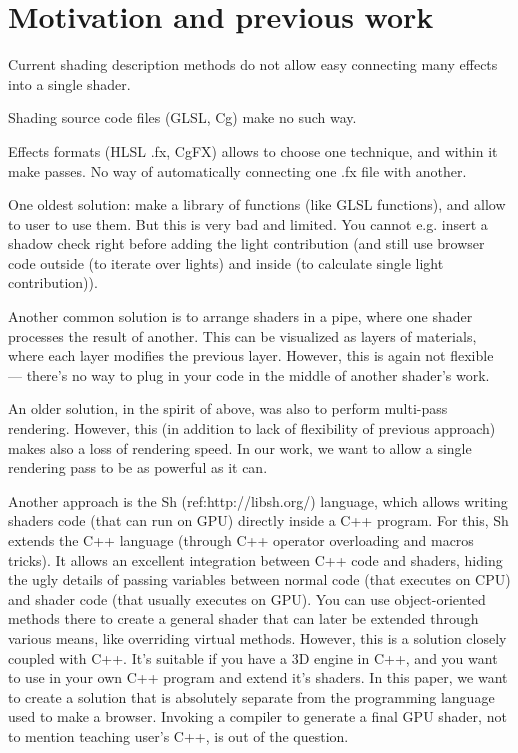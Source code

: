 \documentclass{acmsiggraph}                     %
\begin{document}
\section{Motivation and previous work}

Current shading description methods do not allow easy connecting
many effects into a single shader.

Shading source code files (GLSL, Cg) make no such way.

Effects formats (HLSL .fx, CgFX) allows to choose one technique, and
within it make passes. No way of automatically connecting one .fx file
with another.

One oldest solution: make a library of functions (like GLSL
functions), and allow to user to use them. But this is very bad and
limited. You cannot e.g. insert a shadow check right before adding the
light contribution (and still use browser code outside (to iterate
over lights) and inside (to calculate single light contribution)).

Another common solution is to arrange shaders in a pipe, where one
shader processes the result of another. This can be visualized as
layers of materials, where each layer modifies the previous
layer. However, this is again not flexible --- there's no way to plug
in your code in the middle of another shader's work.

An older solution, in the spirit of above, was also to perform
multi-pass rendering. However, this (in addition to lack of
flexibility of previous approach) makes also a loss of rendering
speed. In our work, we want to allow a single rendering pass to be as
powerful as it can.


Another approach is the Sh (ref:http://libsh.org/) language, which
allows writing shaders code (that can run on GPU) directly inside a
C++ program. For this, Sh extends the C++ language (through C++
operator overloading and macros tricks). It allows an excellent
integration between C++ code and shaders, hiding the ugly details of
passing variables between normal code (that executes on CPU) and
shader code (that usually executes on GPU). You can use
object-oriented methods there to create a general shader that can
later be extended through various means, like overriding virtual
methods. However, this is a solution closely coupled with C++. It's
suitable if you have a 3D engine in C++, and you want to use in your
own C++ program and extend it's shaders. In this paper, we want to
create a solution that is absolutely separate from the programming
language used to make a browser. Invoking a compiler to generate a
final GPU shader, not to mention teaching user's C++, is out of the
question.
\end{document}
